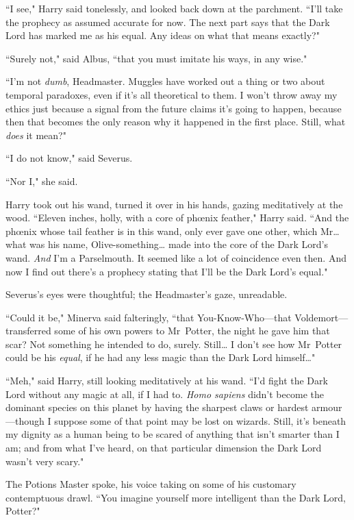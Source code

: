``I see," Harry said tonelessly, and looked back down at the parchment. ``I'll take the prophecy as assumed accurate for now. The next part says that the Dark Lord has marked me as his equal. Any ideas on what that means exactly?"

``Surely not," said Albus, ``that you must imitate his ways, in any wise."

``I'm not \emph{dumb}, Headmaster. Muggles have worked out a thing or two about temporal paradoxes, even if it's all theoretical to them. I won't throw away my ethics just because a signal from the future claims it's going to happen, because then that becomes the only reason why it happened in the first place. Still, what \emph{does} it mean?"

``I do not know," said Severus.

``Nor I," she said.

Harry took out his wand, turned it over in his hands, gazing meditatively at the wood. ``Eleven inches, holly, with a core of phœnix feather," Harry said. ``And the phœnix whose tail feather is in this wand, only ever gave one other, which Mr{\ldots} what was his name, Olive-something{\ldots} made into the core of the Dark Lord's wand. \emph{And} I'm a Parselmouth. It seemed like a lot of coincidence even then. And now I find out there's a prophecy stating that I'll be the Dark Lord's equal."

Severus's eyes were thoughtful; the Headmaster's gaze, unreadable.

``Could it be," Minerva said falteringly, ``that You-Know-Who—that Voldemort—transferred some of his own powers to Mr~Potter, the night he gave him that scar? Not something he intended to do, surely. Still{\ldots} I don't see how Mr~Potter could be his \emph{equal}, if he had any less magic than the Dark Lord himself{\ldots}"

``Meh," said Harry, still looking meditatively at his wand. ``I'd fight the Dark Lord without any magic at all, if I had to. \emph{Homo sapiens} didn't become the dominant species on this planet by having the sharpest claws or hardest armour—though I suppose some of that point may be lost on wizards. Still, it's beneath my dignity as a human being to be scared of anything that isn't smarter than I am; and from what I've heard, on that particular dimension the Dark Lord wasn't very scary."

The Potions Master spoke, his voice taking on some of his customary contemptuous drawl. ``You imagine yourself more intelligent than the Dark Lord, Potter?"

